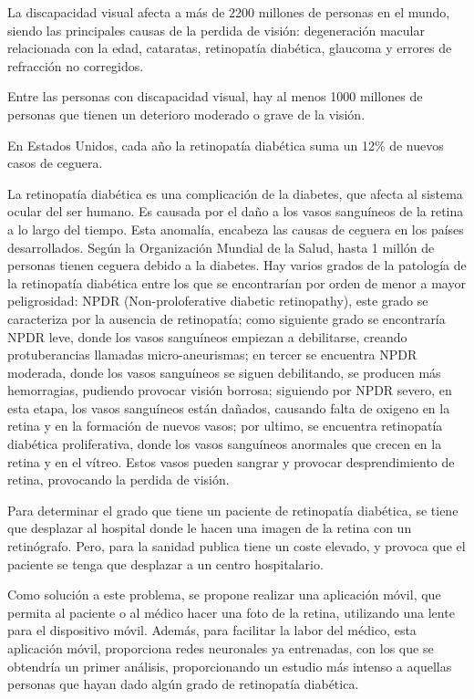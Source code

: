 
La discapacidad visual afecta a más de 2200 millones de personas en el mundo, siendo las principales causas de la perdida de visión: degeneración macular relacionada con la edad, cataratas, retinopatía diabética, glaucoma y errores de refracción no corregidos.\cite{oms-ceguera}


Entre las personas con discapacidad visual, hay al menos 1000 millones de personas que tienen un deterioro moderado o grave de la visión.\cite{oms-ceguera} 

En Estados Unidos, cada año la retinopatía diabética suma un 12\% de nuevos casos de ceguera.

La retinopatía diabética es una complicación de la diabetes, que afecta al sistema ocular del ser humano. Es causada por el daño a los vasos sanguíneos de la retina a lo largo del tiempo. Esta anomalía, encabeza las causas de ceguera en los países desarrollados. Según la Organización Mundial de la Salud, hasta 1 millón de personas tienen ceguera debido a la diabetes. \cite{oms-diabetes}
Hay varios grados de la patología de la retinopatía diabética entre los que se encontrarían por orden de menor a mayor peligrosidad: NPDR (Non-proloferative diabetic retinopathy), este grado se caracteriza por la ausencia de retinopatía; como siguiente grado se encontraría NPDR leve, donde los vasos sanguíneos empiezan a debilitarse, creando protuberancias llamadas micro-aneurismas; en tercer se encuentra NPDR moderada, donde los vasos sanguíneos se siguen debilitando, se producen más hemorragias, pudiendo provocar visión borrosa; siguiendo por NPDR severo, en esta etapa, los vasos sanguíneos están dañados, causando falta de oxigeno en la retina y en la formación de nuevos vasos; por ultimo, se encuentra retinopatía diabética proliferativa, donde los vasos sanguíneos anormales que crecen en la retina y en el vítreo. Estos vasos pueden sangrar y provocar desprendimiento de retina, provocando la perdida de visión. \cite{grados-retinopatia}

Para determinar el grado que tiene un paciente de retinopatía diabética, se tiene que desplazar al hospital donde le hacen una imagen de la retina con un retinógrafo. Pero, para la sanidad publica tiene un coste elevado, y provoca que el paciente se tenga que desplazar a un centro hospitalario. 

Como solución a este problema, se propone realizar una aplicación móvil, que permita al paciente o al médico hacer una foto de la retina, utilizando una lente para el dispositivo móvil. Además, para facilitar la labor del médico, esta aplicación móvil, proporciona redes neuronales ya entrenadas, con los que se obtendría un primer análisis, proporcionando un estudio más intenso a aquellas personas que hayan dado algún grado de retinopatía diabética. 

